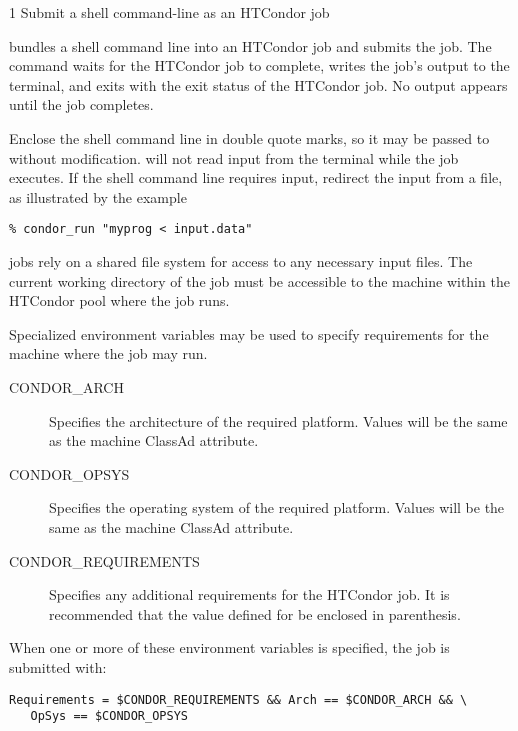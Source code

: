 \begin{ManPage}{\label{man-condor-run}}{1}
{Submit a shell command-line as an HTCondor job}

\Synopsis {}

\Description
{} bundles a shell command line into an HTCondor
job and submits the job.
The  command waits for the HTCondor job to complete,
writes the job's output to the terminal,
and exits with the exit status of the HTCondor job.
No output appears until the job completes.

Enclose the shell command line in double quote marks,
so it may be passed to
 without modification.
 will not read input from the terminal while the job
executes.  If the shell command line requires input,
redirect the input from a file, as illustrated by the example
\begin{verbatim}
% condor_run "myprog < input.data"
\end{verbatim}

 jobs rely on a shared file system for
access to any necessary input files.
The current working directory of the job must be
accessible to the machine within the HTCondor pool where the job runs.

Specialized environment variables may be used to specify
requirements for the machine where the job may run.

\begin{description}
\item[CONDOR\_ARCH] Specifies the architecture of the required
  platform. Values will be the same as the 
  machine ClassAd attribute.
\item[CONDOR\_OPSYS] Specifies the operating system of the required
  platform. Values will be the same as the 
  machine ClassAd attribute.
\item[CONDOR\_REQUIREMENTS] Specifies any additional requirements for
  the HTCondor job.  It is recommended that the value defined for
   be enclosed in parenthesis.
\end{description}

When one or more of these environment variables is specified, the job is
submitted with:

\begin{verbatim}
Requirements = $CONDOR_REQUIREMENTS && Arch == $CONDOR_ARCH && \
   OpSys == $CONDOR_OPSYS
\end{verbatim}


\end{ManPage}
